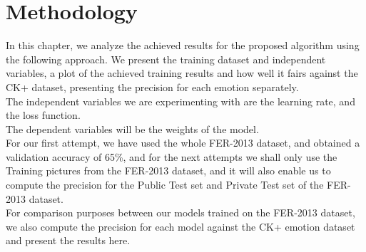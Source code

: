 \documentclass[runningheads,a4paper,11pt]{report}
\begin{document}
\section{Methodology}
\label{section:meth}
In this chapter, we analyze the achieved results for the proposed algorithm using the following approach. We present the training dataset and independent variables, a plot of the achieved training results and how well it fairs against the CK+ dataset, presenting the precision for each emotion separately.\\
The independent variables we are experimenting with are the learning rate, and the loss function.\\
The dependent variables will be the weights of the model.\\
For our first attempt, we have used the whole FER-2013 dataset, and obtained a validation accuracy of 65\%, and for the next attempts we shall only use the Training pictures from the FER-2013 dataset, and it will also enable us to compute the precision for the Public Test set and Private Test set of the FER-2013 dataset.\\ 
For comparison purposes between our models trained on the FER-2013 dataset, we also compute the precision for each model against the CK+ emotion dataset and present the results here.
\end{document}

